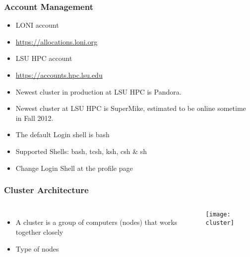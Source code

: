 \documentclass[slidestop,mathserif,compress,xcolor=svgnames,table]{beamer}
\newcommand*\vardiamond{\textcolor{tigerspurple}{%
  \ensuremath{\blacklozenge}}}
\newenvironment{bblock}[0]
{
\begin{beamerboxesrounded}[upper=uppercol1,lower=lowercol1,shadow=true]}
{\end{beamerboxesrounded}}
\newenvironment{eblock}[0]
{
\begin{beamerboxesrounded}[upper=uppercol2,lower=lowercol2,shadow=true]}
{\end{beamerboxesrounded}}
\begin{document}
\begin{frame}
\frametitle{\small Account Management}
\begin{bblock}{}
\begin{itemize}
\item LONI account
\item[] \url{https://allocations.loni.org}
\item LSU HPC account
\item[] \url{https://accounts.hpc.lsu.edu}
\item Newest cluster in production at LSU HPC is Pandora.
\item Newest cluster at LSU HPC is SuperMike, estimated to be online sometime in Fall 2012. 
\end{itemize}
\end{bblock}

\begin{eblock}{}
 \begin{itemize}
  \item The default Login shell is bash
  \item Supported Shells: bash, tcsh, ksh, csh \& sh
  \item Change Login Shell at the profile page
 \end{itemize}
\end{eblock}

\end{frame}

\begin{frame}
\frametitle{\small Cluster Architecture}
\begin{columns}
\column{4cm}
\begin{itemize}
\item A cluster is a group of computers (nodes) that works together closely
\item Type of nodes
\end{itemize}
\column{7cm}
\begin{center}
\texttt{[image: cluster]}
\end{center}
\end{columns}
\end{frame}
\end{document}
